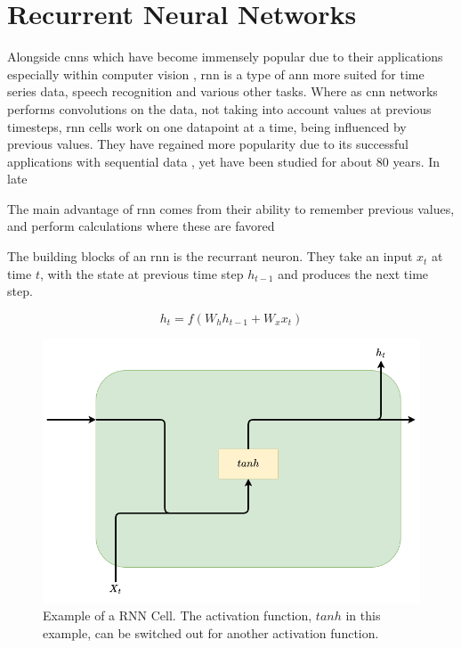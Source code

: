 \section{Recurrent Neural Networks}
\label{back:rnn}

Alongside \acrshort{cnn}s which have become immensely popular due to their applications especially within computer vision \cite{oshea2015introduction}, \acrfull{rnn} is a type of \acrfull{ann} more suited for time series data, speech recognition and various other tasks. Where as \acrfull{cnn} networks performs convolutions on the data, not taking into account values at previous timesteps, \acrshort{rnn} cells work on one datapoint at a time, being influenced by previous values.
 They have regained more popularity due to its successful applications with sequential data \cite{karpathy2015visualizing}, yet have been studied for about 80 years. In late

The main advantage of \acrshort{rnn} comes from their ability to remember previous values, and perform calculations where these are favored

The building blocks of an \acrshort{rnn} is the recurrant neuron. They take an input $x_t$ at time $t$, with the state at previous time step $h_{t-1}$ and produces the next time step. 


\begin{equation}
    h_t = f(W_hh_{t-1}+W_xx_t)
\end{equation}

\begin{figure}[h]
    \centering
    \includegraphics[scale=0.4]{figures/rnncell.png}
    \caption{Example of a RNN Cell. The activation function, $tanh$ in this example, can be switched out for another activation function.}
    \label{fig:rnncell}
\end{figure}


